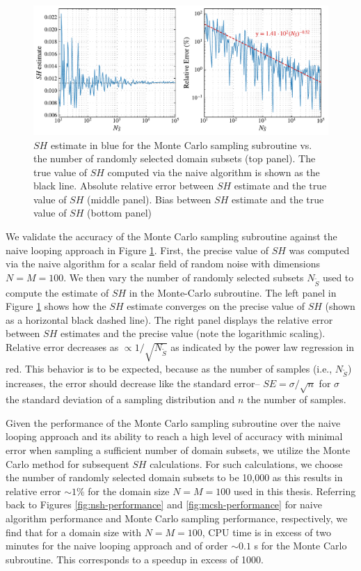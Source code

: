 \begin{figure}[!t]
	\centering
	\includegraphics[width=\textwidth]{figures/chapter2/mcNSH-accuracy-v2.pdf}
	\caption{$SH$ estimate in blue for the Monte Carlo sampling subroutine vs. the number of randomly selected domain subsets (top panel). The true value of $SH$ computed via the naive algorithm is shown as the black line.  Absolute relative error between $SH$ estimate and the true value of $SH$ (middle panel). Bias between $SH$ estimate and the true value of $SH$ (bottom panel) }
	\label{fig:mcsh-accuracy}
\end{figure}

We validate the accuracy of the Monte Carlo sampling subroutine against the naive looping approach in Figure \ref{fig:mcsh-accuracy}. First, the precise value of $SH$ was computed via the naive algorithm for a scalar field of random noise with dimensions $N=M=100$. We then vary the number of randomly selected subsets $N_{\tilde{S}}$ used to compute the estimate of $SH$ in the Monte-Carlo subroutine. The left panel in Figure \ref{fig:mcsh-accuracy} shows how the $SH$ estimate converges on the precise value of $SH$ (shown as a horizontal black dashed line). The right panel displays the relative error between $SH$ estimates and the precise value (note the logarithmic scaling). Relative error decreases as $\propto 1/\sqrt{N_{\tilde{S}}}$ as indicated by the power law regression in red. This behavior is to be expected, because as the number of samples (i.e., $N_{\tilde{S}}$) increases, the error should decrease like the standard error-- $SE = \sigma/\sqrt{n}$ for $\sigma$ the standard deviation of a sampling distribution and $n$ the number of samples.

Given the performance of the Monte Carlo sampling subroutine over the naive looping approach and its ability to reach a high level of accuracy with minimal error when sampling a sufficient number of domain subsets, we utilize the Monte Carlo method for subsequent $SH$ calculations. For such calculations, we choose the number of randomly selected domain subsets to be 10,000 as this results in relative error $\sim 1\%$ for the domain size $N=M=100$ used in this thesis. Referring back to Figures \ref{fig:nsh-performance} and \ref{fig:mcsh-performance} for naive algorithm performance and Monte Carlo sampling performance, respectively, we find that for a domain size with $N=M=100$, CPU time is in excess of two minutes for the naive looping approach and of order $\sim0.1$ \si{s} for the Monte Carlo subroutine. This corresponds to a speedup in excess of 1000.

